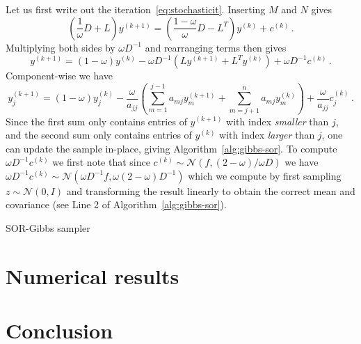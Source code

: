 \documentclass[
fontsize=11pt,
paper=a4,
numbers=noenddot
]{scrartcl}
\begin{document}
Let us first write out the iteration~\eqref{eq:stochasticit}. Inserting $M$ and $N$ gives
\begin{equation*}
    \left(\frac{1}{\omega} D + L\right) y^{(k+1)} = \left(\frac{1-\omega}{\omega} D - L^T\right) y^{(k)} + c^{(k)}\,.
\end{equation*}
Multiplying both sides by $\omega D^{-1}$ and rearranging terms then gives
\begin{equation*}
    y^{(k+1)} = (1 - \omega) y^{(k)} - \omega D^{-1} (L y^{(k+1)} + L^T y^{(k)}) + \omega D^{-1} c^{(k)}\,.
\end{equation*}
Component-wise we have
\begin{equation*}
    y^{(k+1)}_j = (1-\omega) y^{(k)}_j - \frac{\omega}{a_{jj}} \left(
        \sum_{m=1}^{j-1} a_{mj} y^{(k+1)}_m + \sum_{m=j+1}^n a_{mj} y^{(k)}_m
    \right) + \frac{\omega}{a_{jj}} c^{(k)}_j \,.
\end{equation*}
Since the first sum only contains entries of $y^{(k+1)}$ with index \emph{smaller} than $j$, and the second sum only contains entries of $y^{(k)}$ with index \emph{larger} than $j$, one can update the sample in-place, giving Algorithm~\ref{alg:gibbs-sor}. To compute $\omega D^{-1} c^{(k)}$ we first note that since $c^{(k)} \sim \mathcal{N}(f, (2-\omega)/\omega D)$ we have $\omega D^{-1} c^{(k)} \sim \mathcal{N}(\omega D^{-1}f, \omega(2-\omega)D^{-1})$ which we compute by first sampling $z \sim \mathcal{N}(0, I)$ and transforming the result linearly to obtain the correct mean and covariance (see Line 2 of Algorithm~\ref{alg:gibbs-sor}).

\begin{algorithm}[htpb]
    \SetAlgoLined
    \caption{SOR-Gibbs sampler}\label{alg:gibbs-sor}
  \end{algorithm}


\section{Numerical results}

\section{Conclusion}
\end{document}
